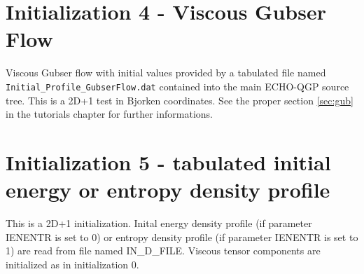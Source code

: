 \section{Initialization 4 - Viscous Gubser Flow}
Viscous Gubser flow with initial values provided by a tabulated file named {\tt Initial\_Profile\_GubserFlow.dat} contained into the main ECHO-QGP source tree. This is a 2D+1 test in Bjorken coordinates. See the proper section \ref{sec:gub} in the tutorials chapter for further informations.\\
\section{Initialization 5 - tabulated initial energy or entropy density profile}
This is a 2D+1 initialization. Inital energy density profile (if parameter IENENTR is set to 0) or entropy density profile (if parameter IENENTR is set to 1) are read from file named IN\_D\_FILE. Viscous tensor components are initialized as in initialization 0.\\ 

